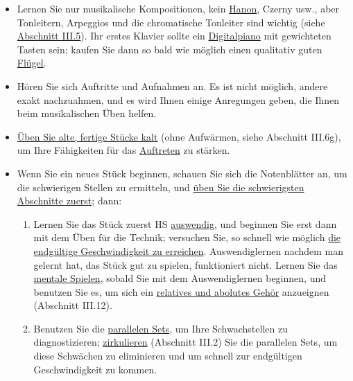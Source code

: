 \begin{itemize} 
\item Lernen Sie nur musikalische Kompositionen, kein \hyperlink{c1iii7h}{Hanon}, Czerny usw., aber Tonleitern, Arpeggios und die chromatische Tonleiter sind wichtig (siehe \hyperlink{c1iii5a}{Abschnitt III.5}).
Ihr erstes Klavier sollte ein \hyperlink{c1iii17b}{Digitalpiano} mit gewichteten Tasten sein; kaufen Sie dann so bald wie möglich einen qualitativ guten \hyperlink{c1iii17d}{Flügel}.

\item Hören Sie sich Auftritte und Aufnahmen an.
Es ist nicht möglich, andere exakt nachzuahmen, und es wird Ihnen einige Anregungen geben, die Ihnen beim musikalischen Üben helfen.

\item \hyperlink{c1iii6g}{Üben Sie alte, fertige Stücke kalt} (ohne Aufwärmen, siehe Abschnitt III.6g), um Ihre Fähigkeiten für das \hyperlink{c1iii14}{Auftreten} zu stärken.

\item Wenn Sie ein neues Stück beginnen, schauen Sie sich die Notenblätter an, um die schwierigen Stellen zu ermitteln, und \hyperlink{c1ii5}{üben Sie die schwierigsten Abschnitte zuerst}; dann:

 \begin{enumerate}[label={\alph*.}] 
 <li>Üben Sie \hyperlink{c1ii7}{mit getrennten Händen} und mit sich überschneidenden Abschnitten (\hyperlink{c1ii8}{Kontinuitätsregel}, Abschnitt II.8); wechseln Sie oft die Hände, wenn notwendig, alle fünf Sekunden.
Die gesamte technische Entwicklung sollte HS erfolgen.
 
 \item Lernen Sie das Stück zuerst HS \hyperlink{c1iii6}{auswendig}, und beginnen Sie erst dann mit dem Üben für die Technik; versuchen Sie, so schnell wie möglich \hyperlink{c1iii7i}{die endgültige Geschwindigkeit zu erreichen}.
Auswendiglernen nachdem man gelernt hat, das Stück gut zu spielen, funktioniert nicht.
Lernen Sie das \hyperlink{c1ii12mental}{mentale Spielen}, sobald Sie mit dem Auswendiglernen beginnen, und benutzen Sie es, um sich ein \hyperlink{c1iii12}{relatives und abolutes Gehör} anzueignen (Abschnitt III.12).
 
 \item Benutzen Sie die \hyperlink{c1ii11}{parallelen Sets}, um Ihre Schwachstellen zu diagnostizieren; \hyperlink{c1iii2}{zirkulieren} (Abschnitt III.2) Sie die parallelen Sets, um diese Schwächen zu eliminieren und um schnell zur endgültigen Geschwindigkeit zu kommen.
 

\end{enumerate}
\end{itemize}
